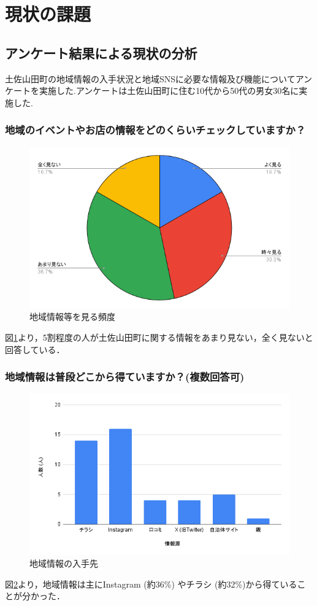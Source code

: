 \section{現状の課題}
\subsection{アンケート結果による現状の分析}
土佐山田町の地域情報の入手状況と地域SNSに必要な情報及び機能についてアンケートを実施した.アンケートは土佐山田町に住む10代から50代の男女30名に実施した.

\subsubsection{地域のイベントやお店の情報をどのくらいチェックしていますか？}
\begin{figure}[H]
    \centering
    \includegraphics[width=0.5\linewidth]{sections/fig125/Q1.png}
    \caption{地域情報等を見る頻度}
    \label{fig:Q1}
\end{figure}
図\ref{fig:Q1}より，5割程度の人が土佐山田町に関する情報をあまり見ない，全く見ないと回答している．

\subsubsection{地域情報は普段どこから得ていますか？(複数回答可)}
\begin{figure}[H]
    \centering
    \includegraphics[width=0.5\linewidth]{sections/fig125/Q3.png}
    \caption{地域情報の入手先}
    \label{fig:Q3}
\end{figure}
図\ref{fig:Q3}より，地域情報は主にInstagram (約36\%) やチラシ (約32\%)から得ていることが分かった．

